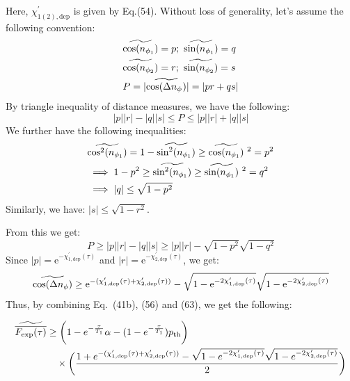 Here, $\chi^{\prime}_{1(2),\text{dep}}$ is given by Eq.(54).
Without loss of generality, let's assume the following convention:
\begin{subequations}
    \begin{align}
        &\widetilde{\text{cos}(n_{\phi_{1}})} = p; ~\widetilde{\text{sin}(n_{\phi_{1}})} = q\\
        &\widetilde{\text{cos}(n_{\phi_{2}})} = r; ~\widetilde{\text{sin}(n_{\phi_{2}})} = s\\
        &P = |\widetilde{\text{cos}(\Delta n_{\phi_{}})}| = |pr + qs|
    \end{align}
\end{subequations}
By triangle inequality of distance measures, we have the following:
\begin{equation}
   |p||r| - |q||s|  \le P \le |p||r| + |q||s| 
\end{equation}
We further have the following inequalities:
\begin{subequations}
\begin{align}
    &\widetilde{\text{cos}^{2}(n_{\phi_{1}})} = 1 - \widetilde{\text{sin}^{2}(n_{\phi_{1}})} \ge \widetilde{\text{cos}(n_{\phi_{1}})}~^{2} = p^{2}\\
    &\implies 1 - p^2 \ge \widetilde{\text{sin}^{2}(n_{\phi_{1}})} \ge \widetilde{\text{sin}(n_{\phi_{1}})}~^{2} = q^{2} \\
    &\implies |q| \le \sqrt{1-p^2} 
\end{align}
\end{subequations}
Similarly, we have: $|s| \le \sqrt{1-r^2}$.

From this we get:
\begin{equation}
    P \ge |p||r| - |q||s| \ge |p||r| - \sqrt{1-p^2}\sqrt{1-q^2}
\end{equation}
Since $|p|=\text{e}^{-\chi^{\prime}_{1,\text{dep}}(\tau)}$ and $|r|=\text{e}^{-\chi^{\prime}_{2,\text{dep}}(\tau)}$, we get:
\begin{equation}
    \widetilde{\text{cos}(\Delta n_{\phi})} \ge \text{e}^{-(\chi^{\prime}_{1,\text{dep}}(\tau)+\chi^{\prime}_{2,\text{dep}}(\tau))} - \sqrt{1 - \text{e}^{-2\chi^{\prime}_{1,\text{dep}}(\tau)}}\sqrt{1 - \text{e}^{-2\chi^{\prime}_{2,\text{dep}}(\tau)}}
\end{equation}
Thus, by combining Eq.~(41b), (56) and (63), we get the following:
\begin{tcolorbox}[breakable, colback=white]
\begin{align}
\widetilde{\overline{F_{\text{exp}}(\tau)}} 
&\ge \bigg(1 - e^{-\frac{\tau}{T_1}} \alpha - (1 - e^{-\frac{\tau}{T_1}}) p_{\text{th}} \bigg) \nonumber \\
&\quad \times \bigg( \frac{1 + e^{-(\chi'_{1,\text{dep}}(\tau) + \chi'_{2,\text{dep}}(\tau))} 
- \sqrt{1 - e^{-2\chi'_{1,\text{dep}}(\tau)}} \sqrt{1 - e^{-2\chi'_{2,\text{dep}}(\tau)}}}{2} \bigg)
\end{align}
\end{tcolorbox}


